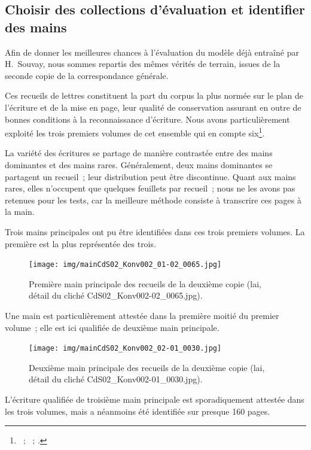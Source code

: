 \documentclass[a4paper,12pt,twoside]{book}
\begin{document}
			\subsection{Choisir des collections d'évaluation et identifier des mains}
				Afin de donner les meilleures chances à l'évaluation du modèle déjà entraîné par H.~Souvay, nous sommes repartis des mêmes vérités de terrain, issues de la seconde copie de la correspondance générale.
				
				Ces recueils de lettres constituent la part du corpus la plus normée sur le plan de l'écriture et de la mise en page, leur qualité de conservation assurant en outre de bonnes conditions à la reconnaissance d'écriture. Nous avons particulièrement exploité les trois premiers volumes de cet ensemble qui en compte six\footnote{\cite{CdS02001330}~; \cite{CdS02001369}~; \cite{CdS02001334}.}.
				
				La variété des écritures se partage de manière contrastée entre des mains dominantes et des mains rares. Généralement, deux mains dominantes se partagent un recueil~; leur distribution peut être discontinue. Quant aux mains rares, elles n'occupent que quelques feuillets par recueil~; nous ne les avons pas retenues pour les tests, car la meilleure méthode consiste à transcrire ces pages à la main.
				
				Trois mains principales ont pu être identifiées dans ces trois premiers volumes. La première est la plus représentée des trois.
				
				\begin{figure}[!h]
					\centering
					\texttt{[image: img/mainCdS02\_Konv002\_01-02\_0065.jpg]}
					\caption{Première main principale des recueils de la deuxième copie (\gls{lai}, détail du cliché CdS02\_Konv002-02\_0065.jpg).}
					\label{}
				\end{figure}
			
				Une main est particulièrement attestée dans la première moitié du premier volume~; elle est ici qualifiée de \og deuxième main principale\fg.
				
				\begin{figure}[!h]
					\centering
					\texttt{[image: img/mainCdS02\_Konv002\_02-01\_0030.jpg]}
					\caption{Deuxième main principale des recueils de la deuxième copie (\gls{lai}, détail du cliché CdS02\_Konv002-01\_0030.jpg).}
					\label{}
				\end{figure}
			
				L'écriture qualifiée de \og troisième main principale \fg{} est sporadiquement attestée dans les trois volumes, mais a néanmoins été identifiée sur presque 160 pages.
			
\end{document}

